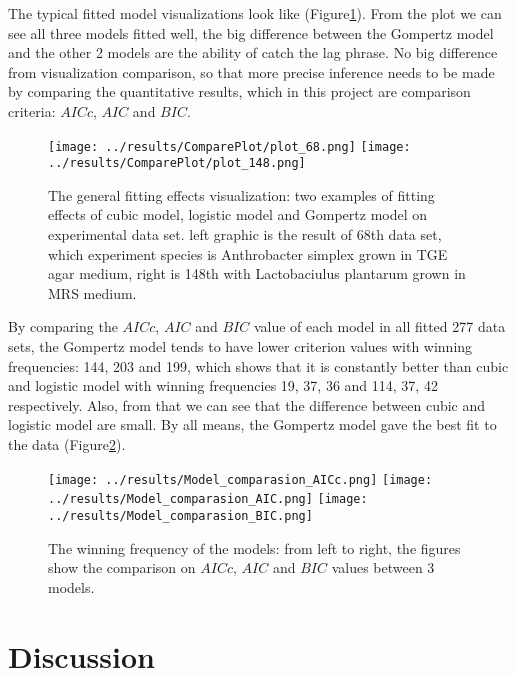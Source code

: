 \documentclass[11pt, a4paper]{article}
\begin{document}
The typical fitted model visualizations look like (Figure\ref{res_visual}). From the plot we can see all three models fitted well, the big difference between the Gompertz model and the other 2 models are the ability of catch the lag phrase. No big difference from visualization comparison, so that more precise inference needs to be made by comparing the quantitative results, which in this project are comparison criteria: $AICc$, $AIC$ and $BIC$.

\begin{figure}\centering
  \texttt{[image: ../results/ComparePlot/plot\_68.png]}
  \texttt{[image: ../results/ComparePlot/plot\_148.png]}
  \caption{\label{res_visual}The general fitting effects visualization: two examples of fitting effects of cubic model, logistic model and Gompertz model on experimental data set. 
  left graphic is the result of 68th data set, which experiment species is Anthrobacter simplex grown in TGE agar medium, right is 148th with Lactobaciulus plantarum grown in MRS medium.}
  \end{figure}
 
By comparing the $AICc$, $AIC$ and $BIC$ value of each model in all fitted 277 data sets, the Gompertz model tends to have lower criterion values with winning frequencies: 144, 203 and 199, which shows that it is constantly better than cubic and logistic model with winning frequencies 19, 37, 36 and 114, 37, 42 respectively. Also, from that we can see that the difference between cubic and logistic model are small. By all means, the Gompertz model gave the best fit to the data (Figure\ref{res_freq}). 

\begin{figure}\centering
  \texttt{[image: ../results/Model\_comparasion\_AICc.png]}
  \texttt{[image: ../results/Model\_comparasion\_AIC.png]}
  \texttt{[image: ../results/Model\_comparasion\_BIC.png]}
  \caption{\label{res_freq}The winning frequency of the models: from left to right, the figures show the comparison on $AICc$, $AIC$ and $BIC$ values between 3 models.}
  \end{figure}


\section{Discussion}
\end{document}
